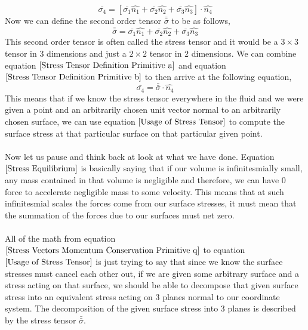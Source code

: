 \begin{equation}\bar{\sigma_{4}} = [\bar{\sigma_{1}}\hat{n_{1}} + \bar{\sigma_{2}}\hat{n_{2}} + \bar{\sigma_{3}}\hat{n_{3}}] \cdot \hat{n_{4}} \label{Stress Tensor Definition Primitive b}\end{equation}
Now we can define the second order tensor $\bar{\bar{\sigma}}$ to be as follows,
\begin{equation}\bar{\bar{\sigma}} = \bar{\sigma_{1}}\hat{n_{1}} + \bar{\sigma_{2}}\hat{n_{2}} + \bar{\sigma_{3}}\hat{n_{3}} \label{Stress Tensor Definition Primitive a}\end{equation}
This second order tensor is often called the stress tensor and it would be a $3\times 3$ tensor in $3$ dimensions and just a $2\times 2$ tensor in $2$ dimensions.
We can combine equation $\ref{Stress Tensor Definition Primitive a}$ and equation $\ref{Stress Tensor Definition Primitive b}$ to then arrive at the following equation,
\begin{equation}\bar{\sigma_{4}} = \bar{\bar{\sigma}}\cdot \hat{n_{4}} \label{Usage of Stress Tensor}\end{equation}
This means that if we know the stress tensor everywhere in the fluid and we were given a point and an arbitrarily chosen unit vector normal to an arbitrarily chosen surface, we can use equation $\ref{Usage of Stress Tensor}$ to compute the surface stress at that particular surface on that particular given point.
\\~\\Now let us pause and think back at look at what we have done.
Equation $\ref{Stress Equilibrium}$ is basically saying that if our volume is infinitesmially small, any mass contained in that volume is negligible and therefore, we can have $0$ force to accelerate negligible mass to some velocity.
This means that at such infinitesmial scales the forces come from our surface stresses, it must mean that the summation of the forces due to our surfaces must net zero.
\\~\\All of the math from equation $\ref{Stress Vectors Momentum Conservation Primitive q}$ to equation $\ref{Usage of Stress Tensor}$ is just trying to say that since we know the surface stresses must cancel each other out, if we are given some arbitrary surface and a stress acting on that surface, we should be able to decompose that given surface stress into an equivalent stress acting on $3$ planes normal to our coordinate system.
The decomposition of the given surface stress into $3$ planes is described by the stress tensor $\bar{\bar{\sigma}}$.
